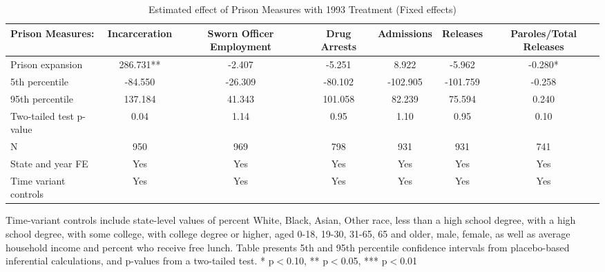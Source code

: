 \begin{table}[htbp]\centering
\tiny
\caption{Estimated effect of Prison Measures with 1993 Treatment (Fixed effects)}
\label{prisons}
\begin{center}
\begin{threeparttable}
\begin{tabular}{l*{6}{c}}
\toprule
\multicolumn{1}{l}{\textbf{Prison Measures:}}&
\multicolumn{1}{c}{\textbf{Incarceration}}&
\multicolumn{1}{c}{\textbf{Sworn Officer Employment}}&
\multicolumn{1}{c}{\textbf{Drug Arrests}}&
\multicolumn{1}{c}{\textbf{Admissions}}&
\multicolumn{1}{c}{\textbf{Releases}}&
\multicolumn{1}{c}{\textbf{Paroles/Total Releases}}\\
\midrule
Prison expansion    &     286.731**   &      -2.407   &      -5.251   &       8.922   &      -5.962   &      -0.280*   \\
5th percentile      &     -84.550   &     -26.309   &     -80.102   &    -102.905   &    -101.759   &      -0.258   \\
95th percentile     &     137.184   &      41.343   &     101.058   &      82.239   &      75.594   &       0.240   \\
Two-tailed test p-value&        0.04   &        1.14   &        0.95   &        1.10   &        0.95   &        0.10   \\
N                   &         950   &         969   &         798   &         931   &         931   &         741   \\
\midrule
State and year FE                              & Yes   & Yes   & Yes   & Yes   & Yes   & Yes            \\
Time variant controls                  & Yes   & Yes   & Yes   & Yes   & Yes   & Yes            \\
\bottomrule
\end{tabular}
\begin{tablenotes}
\tiny
\item Time-variant controls include state-level values of percent White, Black, Asian, Other race, less than a high school degree, with a high school degree, with some college, with college degree or higher, aged 0-18, 19-30, 31-65, 65 and older, male, female, as well as average household income and percent who receive free lunch.  Table presents 5th and 95th percentile confidence intervals from placebo-based inferential calculations, and p-values from a two-tailed test. * p$<$0.10, ** p$<$0.05, *** p$<$0.01
\end{tablenotes}
\end{threeparttable}
\end{center}
\end{table}
